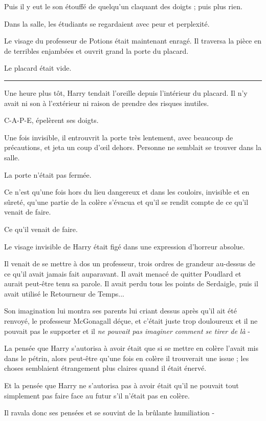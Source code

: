 Puis il y eut le son étouffé de quelqu'un claquant des doigts ; puis plus rien.

Dans la salle, les étudiants se regardaient avec peur et perplexité.

Le visage du professeur de Potions était maintenant enragé. Il traversa la pièce en de terribles enjambées et ouvrit grand la porte du placard.

Le placard était vide.
\par\noindent\rule{\textwidth}{0.4pt}
Une heure plus tôt, Harry tendait l'oreille depuis l'intérieur du placard. Il n'y avait ni son à l'extérieur ni raison de prendre des risques inutiles.

C-A-P-E, épelèrent ses doigts.

Une fois invisible, il entrouvrit la porte très lentement, avec beaucoup de précautions, et jeta un coup d'œil dehors. Personne ne semblait se trouver dans la salle.

La porte n'était pas fermée.

Ce n'est qu'une fois hors du lieu dangereux et dans les couloirs, invisible et en sûreté, qu'une partie de la colère s'évacua et qu'il se rendit compte de ce qu'il venait de faire.

Ce qu'il venait de faire.

Le visage invisible de Harry était figé dans une expression d'horreur absolue.

Il venait de se mettre à dos un professeur, trois ordres de grandeur au-dessus de ce qu'il avait jamais fait auparavant. Il avait menacé de quitter Poudlard et aurait peut-être tenu sa parole. Il avait perdu tous les points de Serdaigle, puis il avait utilisé le Retourneur de Temps...

Son imagination lui montra ses parents lui criant dessus après qu'il ait été renvoyé, le professeur McGonagall déçue, et c'était juste trop douloureux et il ne pouvait pas le supporter et il \emph{ne pouvait pas imaginer comment se tirer de là}  -

La pensée que Harry s'autorisa à avoir était que si se mettre en colère l'avait mis dans le pétrin, alors peut-être qu'une fois en colère il trouverait une issue ; les choses semblaient étrangement plus claires quand il était énervé.

Et la pensée que Harry ne s'autorisa pas à avoir était qu'il ne pouvait tout simplement pas faire face au futur s'il n'était pas en colère.

Il ravala donc ses pensées et se souvint de la brûlante humiliation -


